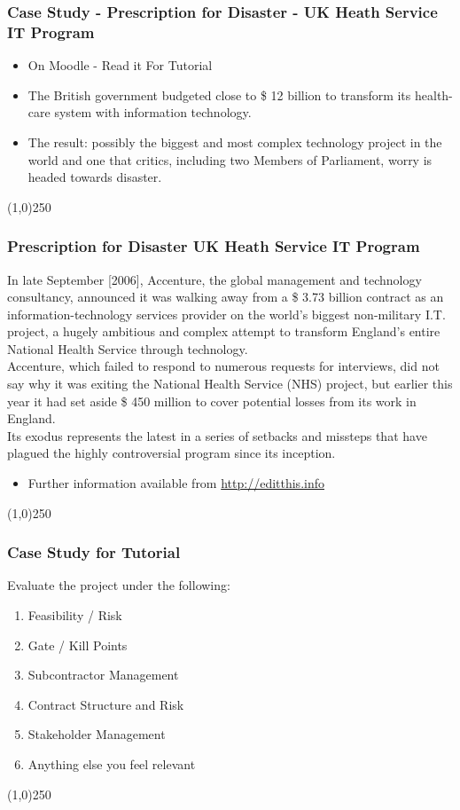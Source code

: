 \begin{frame}
\frametitle{Case Study - 
Prescription for Disaster - UK Heath Service IT Program}
\begin{itemize}
	\item On Moodle -  Read it For Tutorial
	\item The British government budgeted close to \$ 12 billion to transform its health-care system with information technology. 
	\item The result: possibly the biggest and most complex technology project in the world and one that critics, including two Members of Parliament, worry is headed towards disaster.
\end{itemize}
\end{frame}
\begin{center}\line(1,0){250}\end{center}



\begin{frame}
\frametitle{Prescription for Disaster UK Heath Service IT Program}
In late September [2006], Accenture, the global management and technology consultancy, announced it was walking away from a \$ 3.73 billion contract as an information-technology services provider on the world's biggest non-military I.T. project, a hugely ambitious and complex attempt to transform England's entire National Health Service through technology. \\
Accenture, which failed to respond to numerous requests for interviews, did not say why it was exiting the National Health Service (NHS) project, but earlier this year it had set aside \$ 450 million to cover potential losses from its work in England. \\
Its exodus represents the latest in a series of setbacks and missteps that have plagued the highly controversial program since its inception. \\
\begin{itemize}
	\item Further information available from \href{http://editthis.info/nhs_it_info/Main_Page}{http://editthis.info}
\end{itemize}
\end{frame}
\begin{center}\line(1,0){250}\end{center}



\begin{frame}
\frametitle{Case Study for Tutorial}
Evaluate the project under the following:
\begin{enumerate}
\item Feasibility / Risk
\item Gate / Kill Points
\item Subcontractor Management
\item Contract Structure and Risk
\item Stakeholder Management 
\item Anything else you feel relevant
\end{enumerate}
\end{frame}
\begin{center}\line(1,0){250}\end{center}


